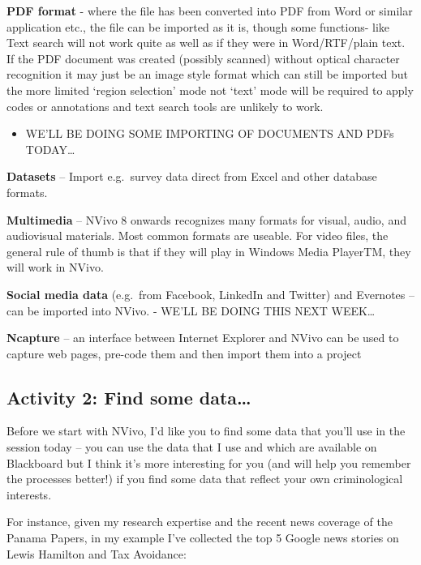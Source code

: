\documentclass[]{book}
\providecommand{\tightlist}{%
  \setlength{\itemsep}{0pt}\setlength{\parskip}{0pt}}
\theoremstyle{definition}
\theoremstyle{definition}
\theoremstyle{definition}
\theoremstyle{remark}
\begin{document}
\textbf{PDF format} - where the file has been converted into PDF from
Word or similar application etc., the file can be imported as it is,
though some functions- like Text search will not work quite as well as
if they were in Word/RTF/plain text. If the PDF document was created
(possibly scanned) without optical character recognition it may just be
an image style format which can still be imported but the more limited
`region selection' mode not `text' mode will be required to apply codes
or annotations and text search tools are unlikely to work.

\begin{itemize}
\tightlist
\item
  WE'LL BE DOING SOME IMPORTING OF DOCUMENTS AND PDFs TODAY\ldots{}
\end{itemize}

\textbf{Datasets} -- Import e.g.~survey data direct from Excel and other
database formats.

\textbf{Multimedia} -- NVivo 8 onwards recognizes many formats for
visual, audio, and audiovisual materials. Most common formats are
useable. For video files, the general rule of thumb is that if they will
play in Windows Media PlayerTM, they will work in NVivo.

\textbf{Social media data} (e.g.~from Facebook, LinkedIn and Twitter)
and Evernotes -- can be imported into NVivo. - WE'LL BE DOING THIS NEXT
WEEK\ldots{}

\textbf{Ncapture} -- an interface between Internet Explorer and NVivo
can be used to capture web pages, pre-code them and then import them
into a project

\hypertarget{activity-2-find-some-data}{%
\subsection{Activity 2: Find some
data\ldots{}}\label{activity-2-find-some-data}}

Before we start with NVivo, I'd like you to find some data that you'll
use in the session today -- you can use the data that I use and which
are available on Blackboard but I think it's more interesting for you
(and will help you remember the processes better!) if you find some data
that reflect your own criminological interests.

For instance, given my research expertise and the recent news coverage
of the Panama Papers, in my example I've collected the top 5 Google news
stories on Lewis Hamilton and Tax Avoidance:
\end{document}
